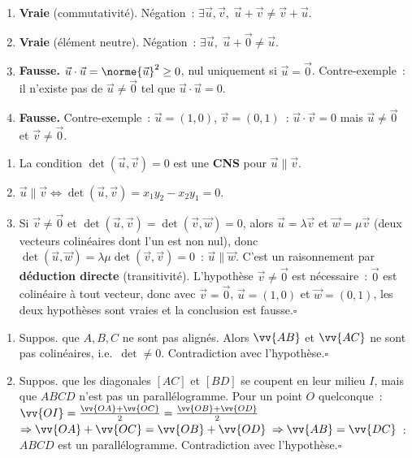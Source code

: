
\begin{enumerate}
  \item \textbf{Vraie} (commutativit\'e).
        N\'egation~: $\exists\vec{u},\vec{v},\;\vec{u}+\vec{v}\ne\vec{v}+\vec{u}$.
  \item \textbf{Vraie} (\'el\'ement neutre).
        N\'egation~: $\exists\vec{u},\;\vec{u}+\vec{0}\ne\vec{u}$.
  \item \textbf{Fausse.} $\vec{u}\cdot\vec{u}=\norme{\vec{u}}^2\geq0$, nul uniquement si $\vec{u}=\vec{0}$.
        Contre-exemple~: il n'existe pas de $\vec{u}\ne\vec{0}$ tel que $\vec{u}\cdot\vec{u}=0$.
  \item \textbf{Fausse.} Contre-exemple~: $\vec{u}=(1,0)$, $\vec{v}=(0,1)$~:
        $\vec{u}\cdot\vec{v}=0$ mais $\vec{u}\ne\vec{0}$ et $\vec{v}\ne\vec{0}$.
\end{enumerate}


\begin{enumerate}
  \item La condition $\det(\vec{u},\vec{v})=0$ est une \textbf{CNS} pour $\vec{u}\parallel\vec{v}$.
  \item $\vec{u}\parallel\vec{v}\Leftrightarrow\det(\vec{u},\vec{v})=x_1y_2-x_2y_1=0$.
  \item Si $\vec{v}\ne\vec{0}$ et $\det(\vec{u},\vec{v})=\det(\vec{v},\vec{w})=0$, alors $\vec{u}=\lambda\vec{v}$ et $\vec{w}=\mu\vec{v}$ (deux vecteurs colin\'eaires dont l'un est non nul), donc $\det(\vec{u},\vec{w})=\lambda\mu\det(\vec{v},\vec{v})=0$~: $\vec{u}\parallel\vec{w}$.
        C'est un raisonnement par \textbf{d\'eduction directe} (transitivit\'e).
        L'hypoth\`ese $\vec{v}\ne\vec{0}$ est n\'ecessaire~: $\vec{0}$ est colin\'eaire \`a tout vecteur, donc avec $\vec{v}=\vec{0}$, $\vec{u}=(1,0)$ et $\vec{w}=(0,1)$, les deux hypoth\`eses sont vraies et la conclusion est fausse.\hfill$\square$
\end{enumerate}


\begin{enumerate}
  \item Suppos. que $A,B,C$ ne sont pas align\'es.
        Alors $\vv{AB}$ et $\vv{AC}$ ne sont pas colin\'eaires, i.e.\ $\det\ne0$.
        Contradiction avec l'hypoth\`ese.\hfill$\square$
  \item Suppos. que les diagonales $[AC]$ et $[BD]$ se coupent en leur milieu $I$,
        mais que $ABCD$ n'est pas un parall\'elogramme.
        Pour un point $O$ quelconque~: $\vv{OI}=\frac{\vv{OA}+\vv{OC}}{2}=\frac{\vv{OB}+\vv{OD}}{2}$
        $\Rightarrow\vv{OA}+\vv{OC}=\vv{OB}+\vv{OD}$
        $\Rightarrow\vv{AB}=\vv{DC}$~: $ABCD$ est un parall\'elogramme.
        Contradiction avec l'hypoth\`ese.\hfill$\square$
\end{enumerate}

